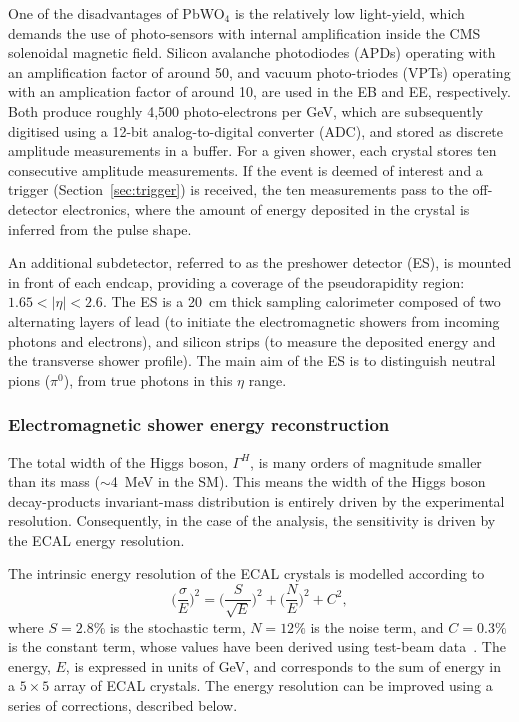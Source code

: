 One of the disadvantages of PbWO$_4$ is the relatively low light-yield, which demands the use of photo-sensors with internal amplification inside the CMS solenoidal magnetic field. Silicon avalanche photodiodes (APDs) operating with an amplification factor of around 50, and vacuum photo-triodes (VPTs) operating with an amplication factor of around 10, are used in the EB and EE, respectively. Both produce roughly 4,500 photo-electrons per GeV, which are subsequently digitised using a 12-bit analog-to-digital converter (ADC), and stored as discrete amplitude measurements in a buffer. For a given shower, each crystal stores ten consecutive amplitude measurements. If the event is deemed of interest and a trigger (Section~\ref{sec:trigger}) is received, the ten measurements pass to the off-detector electronics, where the amount of energy deposited in the crystal is inferred from the pulse shape.

An additional subdetector, referred to as the preshower detector (ES), is mounted in front of each endcap, providing a coverage of the pseudorapidity region: $1.65<|\eta|<2.6$. The ES is a 20~cm thick sampling calorimeter composed of two alternating layers of lead (to initiate the electromagnetic showers from incoming photons and electrons), and silicon strips (to measure the deposited energy and the transverse shower profile). The main aim of the ES is to distinguish neutral pions ($\pi^0$), from true photons in this $\eta$ range. 

\subsubsection{Electromagnetic shower energy reconstruction}
The total width of the Higgs boson, $\Gamma^H$, is many orders of magnitude smaller than its mass ($\sim$4~MeV in the SM). This means the width of the Higgs boson decay-products invariant-mass distribution is entirely driven by the experimental resolution. Consequently, in the case of the \Hgg analysis, the sensitivity is driven by the ECAL energy resolution.

The intrinsic energy resolution of the ECAL crystals is modelled according to
\begin{equation}
    \Big(\frac{\sigma}{E}\Big)^2 =  \Big(\frac{S}{\sqrt{E}}\Big)^2 + \Big(\frac{N}{E}\Big)^2 + C^2,
\end{equation}
\noindent
where $S=2.8\%$ is the stochastic term, $N=12\%$ is the noise term, and $C=0.3\%$ is the constant term, whose values have been derived using test-beam data~\cite{Chatrchyan:2008zzk}. The energy, $E$, is expressed in units of GeV, and corresponds to the sum of energy in a $5\times5$ array of ECAL crystals. The energy resolution can be improved using a series of corrections, described below.

